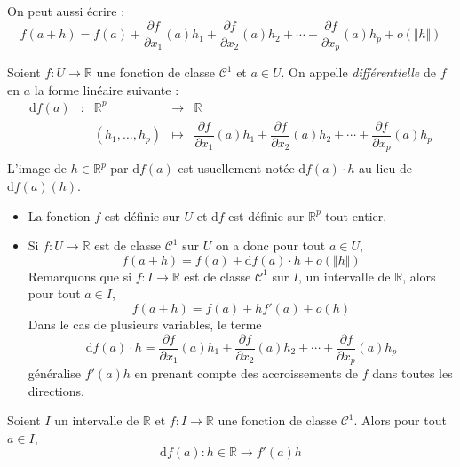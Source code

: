 \documentclass[french,11pt,twoside]{VcCours}
\begin{document}
\begin{Remarque}{} On peut aussi écrire :
$$ f(a+h) = f(a) + \dfrac{\partial f}{\partial x_1}(a) h_1 + \dfrac{\partial f}{\partial x_2}(a) h_2 + \cdots + \dfrac{\partial f}{\partial x_p}(a) h_p + o(\Vert h \Vert)$$
\end{Remarque}

\begin{Definition}{} Soient $f : U \rightarrow \mathbb{R}$ une fonction de classe $\mathcal{C}^1$ et $a \in U$. On appelle \emph{différentielle} de $f$ en $a$ la forme linéaire suivante :
$$ \begin{array}{cccll}
\textrm{d}f(a) & : & \mathbb{R}^p & \rightarrow & \mathbb{R} \\
& & (h_1, \ldots, h_p) & \mapsto & \dfrac{\partial f}{\partial x_1}(a) h_1 + \dfrac{\partial f}{\partial x_2}(a) h_2 + \cdots + \dfrac{\partial f}{\partial x_p}(a) h_p \\
\end{array}$$
L'image de $h \in \mathbb{R}^p$ par $\textrm{d}f(a)$ est usuellement notée $\textrm{d}f(a) \cdot h$ au lieu de $\textrm{d}f(a)(h)$.
\end{Definition}

\begin{Remarques}{}
\begin{itemize}
\item La fonction $f$ est définie sur $U$ et $\textrm{d}f$ est définie sur $\mathbb{R}^p$ tout entier.
\item Si $f : U \rightarrow \mathbb{R}$ est de classe $\mathcal{C}^1$ sur $U$ on a donc pour tout $a \in U$,
$$ f(a+h)=f(a) + \textrm{d}f(a) \cdot h + o (\Vert h \Vert)$$
Remarquons que si $f : I \rightarrow\mathbb{R}$ est de classe $\mathcal{C}^1$ sur $I$, un intervalle de $\mathbb{R}$, alors pour tout $a \in I$,
$$ f(a+h)=f(a) + h f'(a) + o(h)$$
Dans le cas de plusieurs variables, le terme 
$$   \textrm{d}f(a) \cdot h = \dfrac{\partial f}{\partial x_1}(a) h_1 + \dfrac{\partial f}{\partial x_2}(a) h_2 + \cdots + \dfrac{\partial f}{\partial x_p}(a) h_p$$
généralise $f'(a)h$ en prenant compte des accroissements de $f$ dans toutes les directions.
\end{itemize}
\end{Remarques}

\begin{Corollaire}{} Soient $I$ un intervalle de $\mathbb{R}$ et $f : I \rightarrow \mathbb{R}$ une fonction de classe $\mathcal{C}^1$. Alors pour tout $a \in I$, 
$$\textrm{d}f(a) : h \in \mathbb{R} \rightarrow f'(a)h$$
\end{Corollaire}
\end{document}
